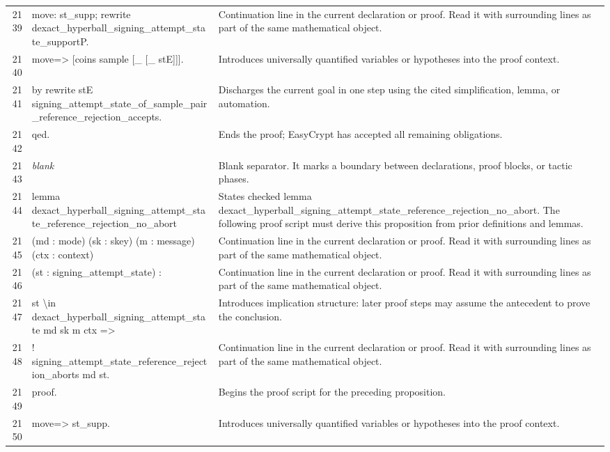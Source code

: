 \documentclass[10pt]{article}
\begin{document}
\begin{longtable}{r L{0.53\textwidth} L{0.37\textwidth}}
2139 & {\ttfamily\scriptsize move: st\_supp; rewrite dexact\_hyperball\_signing\_attempt\_state\_supportP.} & Continuation line in the current declaration or proof.  Read it with surrounding lines as part of the same mathematical object. \\
2140 & {\ttfamily\scriptsize move=> [coins sample [\_ [\_ stE]]].} & Introduces universally quantified variables or hypotheses into the proof context. \\
2141 & {\ttfamily\scriptsize by rewrite stE signing\_attempt\_state\_of\_sample\_pair\_reference\_rejection\_accepts.} & Discharges the current goal in one step using the cited simplification, lemma, or automation. \\
2142 & {\ttfamily\scriptsize qed.} & Ends the proof; EasyCrypt has accepted all remaining obligations. \\
2143 & {\ttfamily\scriptsize \emph{blank}} & Blank separator.  It marks a boundary between declarations, proof blocks, or tactic phases. \\
2144 & {\ttfamily\scriptsize lemma dexact\_hyperball\_signing\_attempt\_state\_reference\_rejection\_no\_abort} & States checked lemma dexact\_hyperball\_signing\_attempt\_state\_reference\_rejection\_no\_abort.  The following proof script must derive this proposition from prior definitions and lemmas. \\
2145 & {\ttfamily\scriptsize    (md : mode) (sk : skey) (m : message) (ctx : context)} & Continuation line in the current declaration or proof.  Read it with surrounding lines as part of the same mathematical object. \\
2146 & {\ttfamily\scriptsize    (st : signing\_attempt\_state) :} & Continuation line in the current declaration or proof.  Read it with surrounding lines as part of the same mathematical object. \\
2147 & {\ttfamily\scriptsize   st \textbackslash{}in dexact\_hyperball\_signing\_attempt\_state md sk m ctx =>} & Introduces implication structure: later proof steps may assume the antecedent to prove the conclusion. \\
2148 & {\ttfamily\scriptsize   ! signing\_attempt\_state\_reference\_rejection\_aborts md st.} & Continuation line in the current declaration or proof.  Read it with surrounding lines as part of the same mathematical object. \\
2149 & {\ttfamily\scriptsize proof.} & Begins the proof script for the preceding proposition. \\
2150 & {\ttfamily\scriptsize move=> st\_supp.} & Introduces universally quantified variables or hypotheses into the proof context. \\

\end{longtable}
\end{document}
